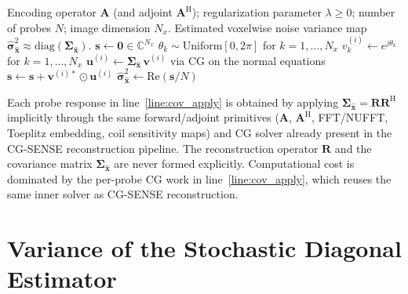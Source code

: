 \documentclass[AMA,STIX2COL,Linenumberson]{MRM}
\begin{document}
\begin{algorithm}[t]
\caption{Probing Image-space COvariance (PICO)}
\label{alg:PICO}
\begin{algorithmic}[1]
\Require Encoding operator $\mathbf{A}$ (and adjoint 
         $\mathbf{A}^{\mathrm{H}}$); regularization 
         parameter $\lambda \ge 0$; number of probes $N$; 
         image dimension $N_x$.
\Ensure  Estimated voxelwise noise variance map 
         $\hat{\boldsymbol{\sigma}}^{2}_{\hat{\mathbf{x}}} 
         \approx 
         \mathrm{diag}(\boldsymbol{\Sigma}_{\hat{\mathbf{x}}})$.
\State $\mathbf{s} \gets \mathbf{0} \in \mathbb{C}^{N_x}$ 
    \State {}
    \State $\theta_k \sim \mathrm{Uniform}[0, 2\pi]$ 
           for $k = 1, \dots, N_x$
    \State $v^{(i)}_k \gets e^{j\theta_k}$ 
           for $k = 1, \dots, N_x$
    \State {}
    \State $\mathbf{u}^{(i)} \gets 
           \boldsymbol{\Sigma}_{\hat{\mathbf{x}}}\,\mathbf{v}^{(i)}$ 
           via CG on the normal equations 
           \label{line:cov_apply}
    \State {}
    \State $\mathbf{s} \gets \mathbf{s} 
           + \mathbf{v}^{(i)*} \odot \mathbf{u}^{(i)}$
\EndFor
\State $\hat{\boldsymbol{\sigma}}^{2}_{\hat{\mathbf{x}}} 
       \gets \mathrm{Re}\!\left(\mathbf{s} / N\right)$ 
\end{algorithmic}
\end{algorithm}

Each probe response in line~\ref{line:cov_apply} is 
obtained by applying $\boldsymbol{\Sigma}_{\hat{\mathbf{x}}} 
= \mathbf{R}\mathbf{R}^{\mathrm{H}}$ implicitly through 
the same forward/adjoint primitives 
($\mathbf{A}$, $\mathbf{A}^{\mathrm{H}}$, FFT/NUFFT, 
Toeplitz embedding, coil sensitivity maps) and CG 
solver already present in the CG-SENSE reconstruction 
pipeline. The reconstruction operator $\mathbf{R}$ and 
the covariance matrix 
$\boldsymbol{\Sigma}_{\hat{\mathbf{x}}}$ are never 
formed explicitly. Computational cost is dominated by 
the per-probe CG work in line~\ref{line:cov_apply}, 
which reuses the same inner solver as CG-SENSE 
reconstruction.
 
\section{Variance of the Stochastic Diagonal Estimator}
\label{app:variance-derivation}
 
\end{document}
